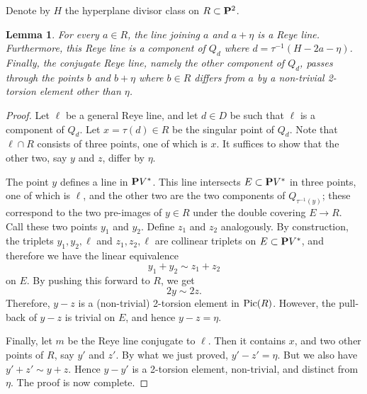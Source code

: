 \documentclass[11pt,reqno]{amsart}
\theoremstyle{plain}
\newtheorem{lemma}[theorem]{Lemma}
\theoremstyle{definition}
\theoremstyle{remark}
\numberwithin{equation}{section}
\renewcommand{\to}{{\longrightarrow}}
\numberwithin{equation}{section}
\begin{document}
Denote by $H$ the hyperplane divisor class on $R \subset \P^2$.
\begin{lemma}\label{lem:reye}
  For every $a \in R$, the line joining $a$ and $a+\eta$ is a Reye line.
  Furthermore, this Reye line is a component of $Q_d$ where $d = \tau^{-1}(H-2a-\eta)$.
  Finally, the conjugate Reye line, namely the other component of $Q_d$, passes through the points $b$ and $b+\eta$ where $b \in R$ differs from $a$ by a non-trivial 2-torsion element other than $\eta$.
\end{lemma}
\begin{proof}
  Let $\ell$ be a general Reye line, and let $d \in D$ be such that $\ell$ is a component of $Q_d$.
  Let $x = \tau(d) \in R$ be the singular point of $Q_d$.
  Note that $\ell \cap R$ consists of three points, one of which is $x$.
  It suffices to show that the other two, say $y$ and $z$, differ by $\eta$.

  The point $y$ defines a line in $\P V^*$.
  This line intersects $E \subset \P V^*$ in three points, one of which is $\ell$, and the other two are the two components of $Q_{\tau^{-1}(y)}$; these correspond to the two pre-images of $y \in R$ under the double covering $E \to R$.
  Call these two points $y_1$ and $y_2$.
  Define $z_1$ and $z_2$ analogously.
  By construction, the triplets $y_1, y_2, \ell$ and $z_1, z_2, \ell$ are collinear triplets on $E \subset \P V^*$, and therefore we have the linear equivalence
  \[ y_1 + y_2 \sim z_1 + z_2\]
  on $E$.
  By pushing this forward to $R$, we get
  \[ 2y \sim 2z.\]
  Therefore, $y - z$ is a (non-trivial) 2-torsion element in $\Pic(R)$.
  However, the pull-back of $y-z$ is trivial on $E$, and hence $y - z = \eta$.

  Finally, let $m$ be the Reye line conjugate to $\ell$.
  Then it contains $x$, and two other points of $R$, say $y'$ and $z'$.
  By what we just proved, $y' - z' = \eta$.
  But we also have $y' + z' \sim y + z$.
  Hence $y - y'$ is a 2-torsion element, non-trivial, and distinct from $\eta$.
  The proof is now complete.  
\end{proof}
\end{document}
